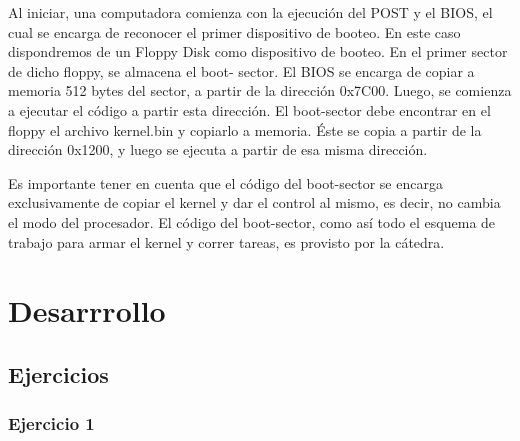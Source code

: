 \documentclass[a4paper]{article}
\begin{document}
Al iniciar, una computadora comienza con la ejecución del POST y el BIOS, el cual se
encarga de reconocer el primer dispositivo de booteo. En este caso dispondremos de un Floppy
Disk como dispositivo de booteo. En el primer sector de dicho floppy, se almacena el boot-
sector. El BIOS se encarga de copiar a memoria 512 bytes del sector, a partir de la dirección
0x7C00. Luego, se comienza a ejecutar el código a partir esta dirección. El boot-sector debe
encontrar en el floppy el archivo kernel.bin y copiarlo a memoria. Éste se copia a partir
de la dirección 0x1200, y luego se ejecuta a partir de esa misma dirección.

Es importante tener en cuenta que el código del boot-sector se encarga exclusivamente de
copiar el kernel y dar el control al mismo, es decir, no cambia el modo del procesador. El
código del boot-sector, como as\'i todo el esquema de trabajo para armar el kernel y correr
tareas, es provisto por la cátedra.

\section{Desarrrollo}

\subsection{Ejercicios}

\subsubsection{Ejercicio 1}
\end{document}
